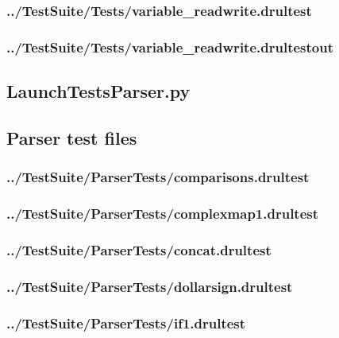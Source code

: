 \begin{changemargin}{-1in}{-1in}
\subsubsection{../TestSuite/Tests/variable\_readwrite.drultest}


\subsubsection{../TestSuite/Tests/variable\_readwrite.drultestout}



\subsection{LaunchTestsParser.py}

\subsection{Parser test files}
\subsubsection{../TestSuite/ParserTests/comparisons.drultest}


\subsubsection{../TestSuite/ParserTests/complexmap1.drultest}


\subsubsection{../TestSuite/ParserTests/concat.drultest}


\subsubsection{../TestSuite/ParserTests/dollarsign.drultest}


\subsubsection{../TestSuite/ParserTests/if1.drultest}



\end{changemargin}
